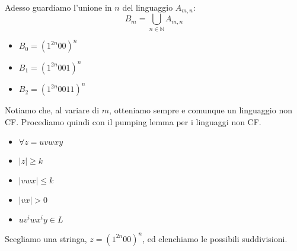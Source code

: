 \documentclass[a4paper,oneside]{scrbook}
\begin{document}
Adesso guardiamo l'unione in $n$ del linguaggio $A_{m,n}$:
$$ B_m = \bigcup_{n\in\mathbb{N}} A_{m,n} $$
\begin{itemize}
	\item $B_0=(1^{2n}00)^n$
	\item $B_1=(1^{2n}001)^n$
	\item $B_2=(1^{2n}0011)^n$
\end{itemize}
Notiamo che, al variare di $m$, otteniamo sempre e comunque un linguaggio non CF.
Procediamo quindi con il pumping lemma per i linguaggi non CF.\\
\begin{itemize}
	\item $\forall z = uvwxy$
	\item $|z| \geq k$
	\item $|vwx| \leq k$
	\item $|vx|>0$
	\item $uv^iwx^iy\in L$
\end{itemize}
Scegliamo una stringa, $z=(1^{2n}00)^n$, ed elenchiamo le possibili suddivisioni.
\end{document}
